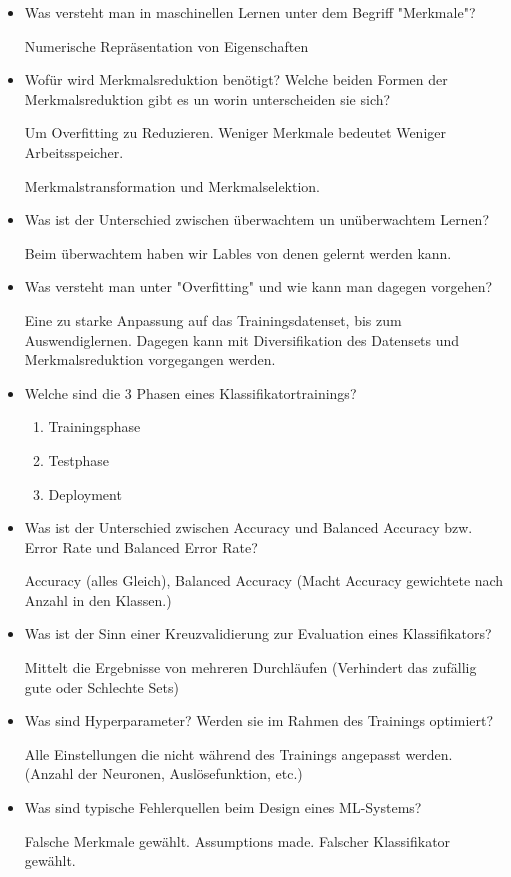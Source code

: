 \documentclass[a4paper]{article}
\begin{document}
\begin{itemize}
    \item Was versteht man in maschinellen Lernen unter dem Begriff "Merkmale"?
    
    Numerische Repräsentation von Eigenschaften
    \item Wofür wird Merkmalsreduktion benötigt? Welche beiden Formen der Merkmalsreduktion gibt es un worin unterscheiden sie sich?
    
    Um Overfitting zu Reduzieren. Weniger Merkmale bedeutet Weniger Arbeitsspeicher.

    Merkmalstransformation und Merkmalselektion.
    \item Was ist der Unterschied zwischen überwachtem un unüberwachtem Lernen?
    
    Beim überwachtem haben wir Lables von denen gelernt werden kann.
    \item Was versteht man unter "Overfitting" und wie kann man dagegen vorgehen?
    
    Eine zu starke Anpassung auf das Trainingsdatenset, bis zum Auswendiglernen. Dagegen kann mit Diversifikation des Datensets und Merkmalsreduktion vorgegangen werden.
    \item Welche sind die 3 Phasen eines Klassifikatortrainings?
    
    \begin{enumerate}
        \item Trainingsphase
        \item Testphase
        \item Deployment
    \end{enumerate}
    \item Was ist der Unterschied zwischen Accuracy und Balanced Accuracy bzw. Error Rate und Balanced Error Rate?
    
    Accuracy (alles Gleich), Balanced Accuracy (Macht Accuracy gewichtete nach Anzahl in den Klassen.)
    \item Was ist der Sinn einer Kreuzvalidierung zur Evaluation eines Klassifikators?
    
    Mittelt die Ergebnisse von mehreren Durchläufen (Verhindert das zufällig gute oder Schlechte Sets)
    \item Was sind Hyperparameter? Werden sie im Rahmen des Trainings optimiert?
    
    Alle Einstellungen die nicht während des Trainings angepasst werden. (Anzahl der Neuronen, Auslösefunktion, etc.)
    \item Was sind typische Fehlerquellen beim Design eines ML-Systems?
    
    Falsche Merkmale gewählt. Assumptions made. Falscher Klassifikator gewählt.
\end{itemize}
\end{document}
